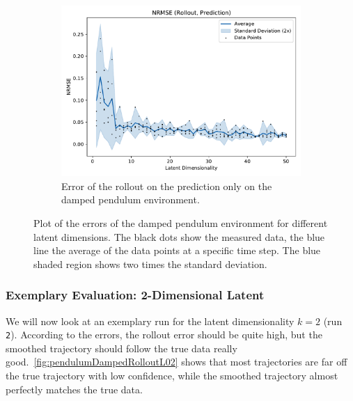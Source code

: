 \begin{figure}
\begin{subfigure}{0.5\linewidth}
					\label{fig:pendulumDampedRmseTrain}
				\end{subfigure}%
				~
				\begin{subfigure}{0.5\linewidth}
					\centering
					\includegraphics[width=\linewidth]{figures/results/pendulum-damped/latent-dim/comparison-rmse-rollout-prediction-normalized-mean-vs-latent-dim.pdf}
					\caption{Error of the rollout on the prediction only on the damped pendulum environment.}
					\label{fig:pendulumDampedRmsePred}
				\end{subfigure}
				\caption{Plot of the errors of the damped pendulum environment for different latent dimensions. The black dots show the measured data, the blue line the average of the data points at a specific time step. The blue shaded region shows two times the standard deviation.}
				\label{fig:pendulumDampedRmse}
			\end{figure}

		\subsubsection{Exemplary Evaluation: 2-Dimensional Latent}
			We will now look at an exemplary run for the latent dimensionality \( k = 2 \) (run \texttt{2}). According to the errors, the rollout error should be quite high, but the smoothed trajectory should follow the true data really good.~\autoref{fig:pendulumDampedRolloutL02} shows that most trajectories are far off the true trajectory with low confidence, while the smoothed trajectory almost perfectly matches the true data.

